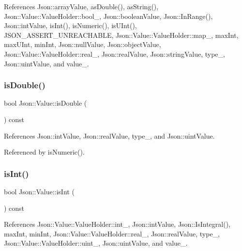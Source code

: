 References Json\+::array\+Value, as\+Double(), as\+String(), Json\+::\+Value\+::\+Value\+Holder\+::bool\+\_\+, Json\+::boolean\+Value, Json\+::\+In\+Range(), Json\+::int\+Value, is\+Int(), is\+Numeric(), is\+U\+Int(), J\+S\+O\+N\+\_\+\+A\+S\+S\+E\+R\+T\+\_\+\+U\+N\+R\+E\+A\+C\+H\+A\+B\+LE, Json\+::\+Value\+::\+Value\+Holder\+::map\+\_\+, max\+Int, max\+U\+Int, min\+Int, Json\+::null\+Value, Json\+::object\+Value, Json\+::\+Value\+::\+Value\+Holder\+::real\+\_\+, Json\+::real\+Value, Json\+::string\+Value, type\+\_\+, Json\+::uint\+Value, and value\+\_\+.

\mbox{\label{classJson_1_1Value_a4a2e2a790e19a1c09fc5dd12d7ad47b5_a4a2e2a790e19a1c09fc5dd12d7ad47b5}} 
\subsubsection{\texorpdfstring{is\+Double()}{isDouble()}}
{\footnotesize\ttfamily bool Json\+::\+Value\+::is\+Double (\begin{DoxyParamCaption}{ }\end{DoxyParamCaption}) const}



References Json\+::int\+Value, Json\+::real\+Value, type\+\_\+, and Json\+::uint\+Value.



Referenced by is\+Numeric().

\mbox{\label{classJson_1_1Value_aff51d8b52979ca06cf9d909accd5f695_aff51d8b52979ca06cf9d909accd5f695}} 
\subsubsection{\texorpdfstring{is\+Int()}{isInt()}}
{\footnotesize\ttfamily bool Json\+::\+Value\+::is\+Int (\begin{DoxyParamCaption}{ }\end{DoxyParamCaption}) const}



References Json\+::\+Value\+::\+Value\+Holder\+::int\+\_\+, Json\+::int\+Value, Json\+::\+Is\+Integral(), max\+Int, min\+Int, Json\+::\+Value\+::\+Value\+Holder\+::real\+\_\+, Json\+::real\+Value, type\+\_\+, Json\+::\+Value\+::\+Value\+Holder\+::uint\+\_\+, Json\+::uint\+Value, and value\+\_\+.



